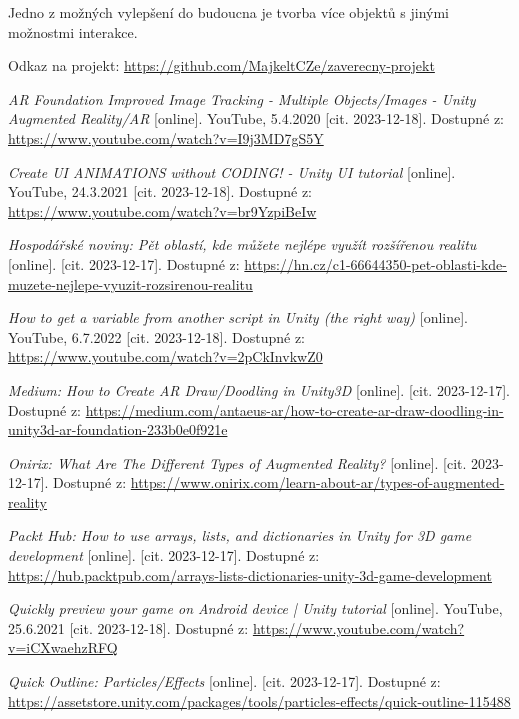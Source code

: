 \documentclass[12pt, a4paper,
twoside,        %
openright
]{report}
\begin{document}
 Jedno z možných vylepšení do budoucna je tvorba více objektů s jinými možnostmi interakce.

Odkaz na projekt: \url{https://github.com/MajkeltCZe/zaverecny-projekt}


\renewcommand\bibname{Seznam použitých informačních zdrojů}
\begin{thebibliography}{99}
 \textit{AR Foundation Improved Image Tracking - Multiple Objects/Images - Unity Augmented Reality/AR} [online]. YouTube, 5.4.2020 [cit. 2023-12-18]. Dostupné z: \url{https://www.youtube.com/watch?v=I9j3MD7gS5Y}

 \textit{Create UI ANIMATIONS without CODING! - Unity UI tutorial} [online]. YouTube, 24.3.2021 [cit. 2023-12-18]. Dostupné z: \url{https://www.youtube.com/watch?v=br9YzpiBeIw}	

\textit{Hospodářské noviny: Pět oblastí, kde můžete nejlépe využít rozšířenou realitu} [online]. [cit. 2023-12-17]. Dostupné z: \url{https://hn.cz/c1-66644350-pet-oblasti-kde-muzete-nejlepe-vyuzit-rozsirenou-realitu}

 \textit{How to get a variable from another script in Unity (the right way)} [online]. YouTube, 6.7.2022 [cit. 2023-12-18]. Dostupné z: \url{https://www.youtube.com/watch?v=2pCkInvkwZ0}

\textit{Medium: 
How to Create AR Draw/Doodling in Unity3D} [online]. [cit. 2023-12-17]. Dostupné z: \url{https://medium.com/antaeus-ar/how-to-create-ar-draw-doodling-in-unity3d-ar-foundation-233b0e0f921e}

\textit{Onirix: What Are The Different Types of Augmented Reality?} [online]. [cit. 2023-12-17]. Dostupné z: \url{https://www.onirix.com/learn-about-ar/types-of-augmented-reality}

\textit{Packt Hub: How to use arrays, lists, and dictionaries in Unity for 3D game development} [online]. [cit. 2023-12-17]. Dostupné z: \url{https://hub.packtpub.com/arrays-lists-dictionaries-unity-3d-game-development}

 \textit{Quickly preview your game on Android device | Unity tutorial} [online]. YouTube, 25.6.2021 [cit. 2023-12-18]. Dostupné z: \url{https://www.youtube.com/watch?v=iCXwaehzRFQ}

\textit{Quick Outline: Particles/Effects} [online]. [cit. 2023-12-17]. Dostupné z: \url{https://assetstore.unity.com/packages/tools/particles-effects/quick-outline-115488}


\end{thebibliography}
\end{document}
